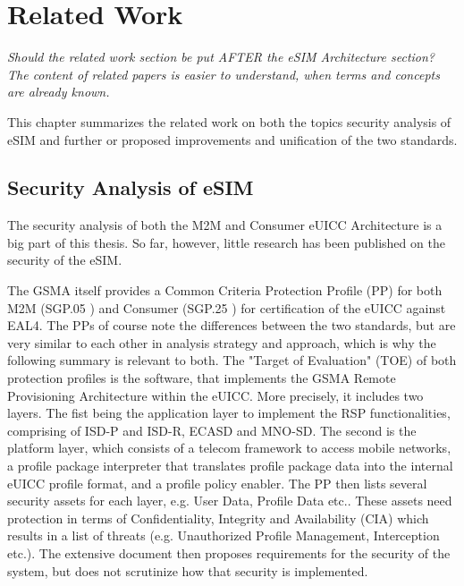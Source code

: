 
\chapter{Related Work}\label{chapter:relWork}

\textit{Should the related work section be put AFTER the eSIM Architecture section? The content of related papers is easier to understand, when terms and concepts are already known.}

This chapter summarizes the related work on both the topics security analysis of eSIM and further or proposed improvements and unification of the two standards.

\section{Security Analysis of eSIM}
The security analysis of both the M2M and Consumer \acrshort{eUICC} Architecture is a big part of this thesis. So far, however, little research has been published on the security of the eSIM.

The GSMA itself provides a Common Criteria Protection Profile (\acrshort{PP}) for both \acrshort{M2M} (SGP.05 \parencite{SGP:05}) and Consumer (SGP.25 \parencite{SGP:25}) for certification of the eUICC against EAL4. The PPs of course note the differences between the two standards, but are very similar to each other in analysis strategy and approach, which is why the following summary is relevant to both. The "Target of Evaluation" (TOE) of both protection profiles is the software, that implements the GSMA Remote Provisioning Architecture within the eUICC. More precisely, it includes two layers. The fist being the application layer to implement the \acrshort{RSP} functionalities, comprising of ISD-P and ISD-R, ECASD and MNO-SD. The second is the platform layer, which consists of a telecom framework to access mobile networks, a profile package interpreter that translates profile package data into the internal eUICC profile format, and a profile policy enabler. The PP then lists several security assets for each layer, e.g. User Data, Profile Data etc.. These assets need protection in terms of Confidentiality, Integrity and Availability (CIA) which results in a list of threats (e.g. Unauthorized Profile Management, Interception etc.). The extensive document then proposes requirements for the security of the system, but does not scrutinize how that security is implemented.

